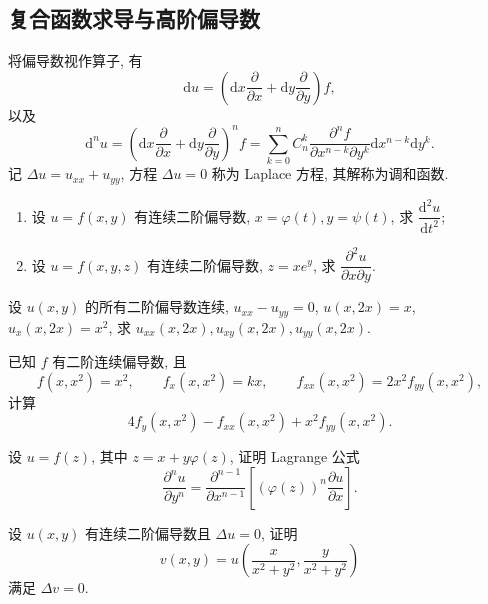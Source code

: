 \documentclass[../数学分析培优讲义.tex]{subfiles}
\begin{document}
\newpage

\subsection{复合函数求导与高阶偏导数}

将偏导数视作算子, 有
\[
    \mathrm{d}u=\left(\mathrm{d}x\dfrac{\partial}{\partial x}+\mathrm{d}y\dfrac{\partial}{\partial y}\right)f,
\]
以及
\[
    \mathrm{d}^nu
    =\left(\mathrm{d}x\dfrac{\partial}{\partial x}+\mathrm{d}y\dfrac{\partial}{\partial y}\right)^nf
    =\sum\limits_{k=0}^nC_n^k
    \dfrac{\partial^nf}{\partial x^{n-k}\partial y^k}
    \mathrm{d}x^{n-k}\mathrm{d}y^k.
\]
记 $\Delta u=u_{xx}+u_{yy}$, 方程 $\Delta u=0$ 称为 Laplace 方程, 其解称为调和函数.

\begin{example}
\begin{enumerate}[label=(\arabic*)]
    \item 设 $u=f(x,y)$ 有连续二阶偏导数, $x=\varphi(t),y=\psi(t)$, 求 $\dfrac{\mathrm{d}^2u}{\mathrm{d}t^2}$;
    \item 设 $u=f(x,y,z)$ 有连续二阶偏导数, $z=xe^y$, 求 $\dfrac{\partial^2u}{\partial x\partial y}$.
\end{enumerate}
\end{example}
\exampleblank

\begin{example}
设 $u(x,y)$ 的所有二阶偏导数连续, $u_{xx}-u_{yy}=0$, $u(x,2x)=x$, $u_x(x,2x)=x^2$, 求 $u_{xx}(x,2x),u_{xy}(x,2x),u_{yy}(x,2x)$.
\end{example}
\exampleblank

\begin{example}
已知 $f$ 有二阶连续偏导数, 且
\[
    f(x,x^2)=x^2,\qquad f_x(x,x^2)=kx,\qquad f_{xx}(x,x^2)=2x^2f_{yy}(x,x^2),
\]
计算
\[
    4f_y(x,x^2)-f_{xx}(x,x^2)+x^2f_{yy}(x,x^2).
\]
\end{example}
\exampleblank

\begin{example}
设 $u=f(z)$, 其中 $z=x+y\varphi(z)$, 证明 Lagrange 公式
\[
    \dfrac{\partial^nu}{\partial y^n}
    =\dfrac{\partial^{n-1}}{\partial x^{n-1}}
    \left[(\varphi(z))^n\dfrac{\partial u}{\partial x}\right].
\]
\end{example}
\exampleblank

\begin{example}
设 $u(x,y)$ 有连续二阶偏导数且 $\Delta u=0$, 证明
\[
    v(x,y)=u\left(\dfrac{x}{x^2+y^2},\dfrac{y}{x^2+y^2}\right)
\]
满足 $\Delta v=0$.
\end{example}
\exampleblank
\end{document}
